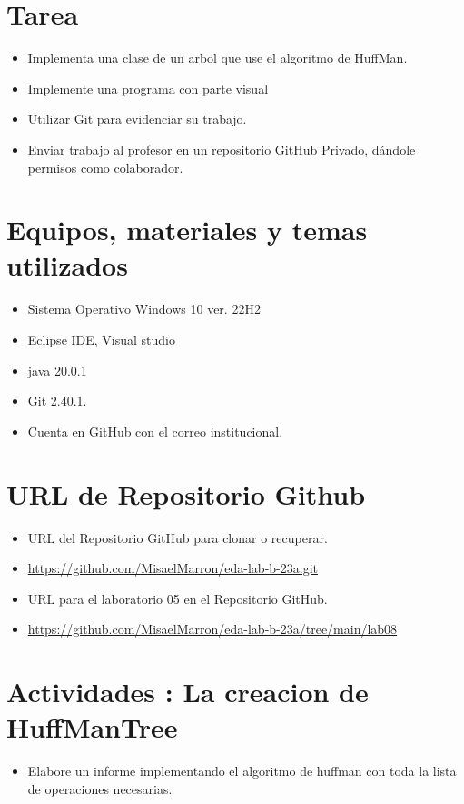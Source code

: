 \documentclass{article}
\begin{document}
	\section{Tarea}
	\begin{itemize}		
		\item Implementa una clase de un arbol que use el algoritmo de HuffMan.
		\item Implemente una programa con parte visual 
		\item Utilizar Git para evidenciar su trabajo.
		\item Enviar trabajo al profesor en un repositorio GitHub Privado, dándole permisos como colaborador.
	\end{itemize}
		
	\section{Equipos, materiales y temas utilizados}
	\begin{itemize}
		\item Sistema Operativo Windows 10  ver. 22H2
		\item Eclipse IDE, Visual studio
		\item java 20.0.1
		\item Git 2.40.1.
		\item Cuenta en GitHub con el correo institucional.	
	\end{itemize}
	
	\section{URL de Repositorio Github}
	\begin{itemize}
		\item URL del Repositorio GitHub para clonar o recuperar.
		\item \url{https://github.com/MisaelMarron/eda-lab-b-23a.git}
		\item URL para el laboratorio 05 en el Repositorio GitHub.
		\item \url{https://github.com/MisaelMarron/eda-lab-b-23a/tree/main/lab08}
	\end{itemize}
	
	\clearpage
	\section{Actividades  : La creacion de HuffManTree}
	\begin{itemize}
		\item Elabore un informe implementando el algoritmo de huffman con toda la lista de operaciones necesarias.     
		
	\end{itemize}
	
\end{document}
